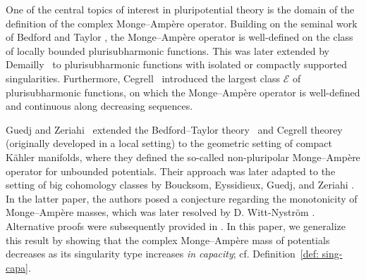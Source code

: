 \documentclass[a4paper]{amsart}
\numberwithin{equation}{section}
\theoremstyle{definition}
\numberwithin{equation}{section}
\begin{document}
One of the central topics of interest in pluripotential theory is the domain of the definition of the complex Monge--Amp\`ere operator. 
Building on the seminal work of Bedford and Taylor \cite{bedford1976dirichlet,bedford1982new}, the Monge--Amp\`{e}re operator is well-defined on the class of locally bounded plurisubharmonic functions.
This was later extended by Demailly~\cite{demailly1993monge} to plurisubharmonic functions with isolated or compactly supported singularities. Furthermore, Cegrell~\cite{cegrell1998pluricomplex,cegrell2004general} introduced the largest class $\mathcal{E}$ of plurisubharmonic functions, on which the Monge--Amp\`ere operator is well-defined and continuous along decreasing sequences.


 Guedj and Zeriahi~\cite{guedj2007weighted} extended the Bedford–Taylor theory~\cite{bedford1987fine} and Cegrell theorey~\cite{cegrell1998pluricomplex} (originally developed in a local setting) to the geometric setting of compact K\"ahler manifolds, where they defined the so-called non-pluripolar Monge--Amp\`ere operator for unbounded potentials. Their approach was later adapted to the setting of big cohomology classes by Boucksom, Eyssidieux, Guedj, and Zeriahi \cite{boucksom2010monge}. In the latter paper, the authors posed a conjecture regarding the monotonicity of Monge--Ampère masses, which was later resolved by D. Witt-Nystr\"om  \cite{wittnystrom19-monotonicity}. Alternative proofs were subsequently provided in \cite{vu2021relative,lu2022hessian,lu2021capacities}.
In this paper, we generalize this result by showing that the complex Monge--Ampère mass of potentials decreases as its singularity type increases {\em in capacity}; cf. Definition~\ref{def: sing-capa}. 
\end{document}

